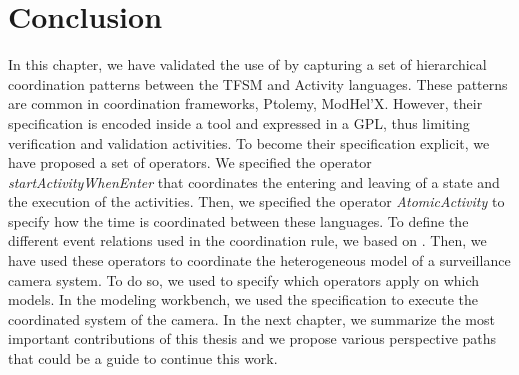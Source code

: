 \section{Conclusion}
In this chapter, we have validated the use of \bcool by capturing a set of hierarchical coordination patterns between the TFSM and Activity languages. These patterns are common in coordination frameworks, \eg Ptolemy, ModHel'X. However, their specification is encoded inside a tool and expressed in a GPL, thus limiting verification and validation activities. To become their specification explicit, we have proposed a set of \bcool operators. We specified the operator \emph{startActivityWhenEnter} that coordinates the entering and leaving of a state and the execution of the activities. Then, we specified the operator \emph{AtomicActivity} to specify how the time is coordinated between these languages. To define the different event relations used in the coordination rule, we based on \moccml. Then, we have used these operators to coordinate the heterogeneous model of a surveillance camera system. To do so, we used \bflow to specify which operators apply on which models. In the modeling workbench, we used the \bflow specification to execute the coordinated system of the camera. In the next chapter, we summarize the most important contributions of this thesis and we propose various perspective paths that could be a guide to continue this work. 

 
